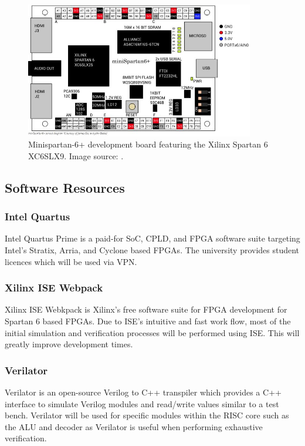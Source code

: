 \documentclass[11pt,a4paper]{report}
\begin{document}
{\begin{figure}[h]
\centering 
\includegraphics[width=10cm]{../img/minispartan}
\caption{Minispartan-6+ development board featuring the Xilinx Spartan 6 XC6SLX9. Image source: \cite{scarabhardware}.}
\label{fig:minispartan}
\end{figure}

\subsection{Software Resources}
\subsubsection{Intel Quartus}
Intel Quartus Prime is a paid-for SoC, CPLD, and FPGA software suite targeting Intel's Stratix, Arria, and Cyclone based FPGAs. The university provides student licences which will be used via VPN.


\subsubsection{Xilinx ISE Webpack}
Xilinx ISE Webkpack is Xilinx's free software suite for FPGA development for Spartan 6 based FPGAs.
Due to ISE's intuitive and fast work flow, most of the initial simulation and verification processes will be performed using ISE. This will greatly improve development times.

\subsubsection{Verilator}
Verilator is an open-source Verilog to C++ transpiler which provides a C++ interface to simulate Verilog modules and read/write values similar to a test bench. Verilator will be used for specific modules within the RISC core such as the ALU and decoder as Verilator is useful when performing exhaustive verification.

}
\end{document}
